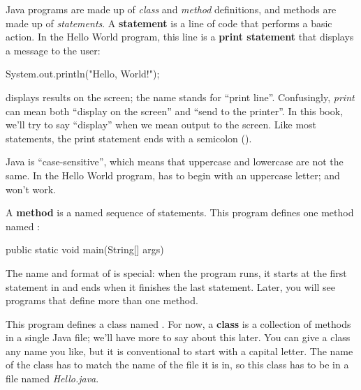 
Java programs are made up of {\em class} and {\em method} definitions, and methods are made up of {\em statements}.
A {\bf statement} is a line of code that performs a basic action.
In the Hello World program, this line is a {\bf print statement} that displays a message to the user:

\begin{code}
System.out.println("Hello, World!");
\end{code}


 displays results on the screen; the name  stands for ``print line''.
Confusingly, {\em print} can mean both ``display on the screen'' and ``send to the printer''.
In this book, we'll try to say ``display'' when we mean output to the screen.
Like most statements, the print statement ends with a semicolon (\java{;}).


Java is ``case-sensitive'', which means that uppercase and lowercase are not the same.
In the Hello World program,  has to begin with an uppercase letter;  and  won't work.


A {\bf method} is a named sequence of statements.
This program defines one method named :

\begin{code}
public static void main(String[] args)
\end{code}


The name and format of  is special: when the program runs, it starts at the first statement in  and ends when it finishes the last statement.
Later, you will see programs that define more than one method.


This program defines a class named .
For now, a {\bf class} is a collection of methods in a single Java file; we'll have more to say about this later.
You can give a class any name you like, but it is conventional to start with a capital letter.
The name of the class has to match the name of the file it is in, so this class has to be in a file named {\it Hello.java}.


